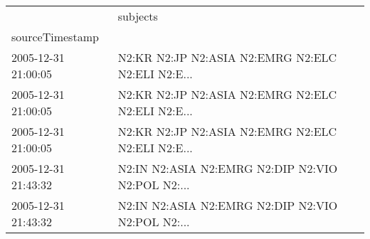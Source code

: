 \begin{tabular}{ll}
\toprule
{} &                                           subjects \\
sourceTimestamp     &                                                    \\
\midrule
2005-12-31 21:00:05 &  N2:KR N2:JP N2:ASIA N2:EMRG N2:ELC N2:ELI N2:E... \\
2005-12-31 21:00:05 &  N2:KR N2:JP N2:ASIA N2:EMRG N2:ELC N2:ELI N2:E... \\
2005-12-31 21:00:05 &  N2:KR N2:JP N2:ASIA N2:EMRG N2:ELC N2:ELI N2:E... \\
2005-12-31 21:43:32 &  N2:IN N2:ASIA N2:EMRG N2:DIP N2:VIO N2:POL N2:... \\
2005-12-31 21:43:32 &  N2:IN N2:ASIA N2:EMRG N2:DIP N2:VIO N2:POL N2:... \\
\bottomrule
\end{tabular}
